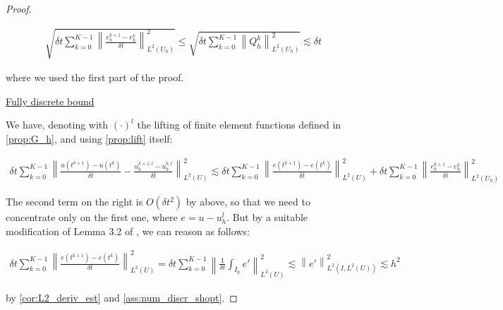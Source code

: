 \documentclass[english,a4paper,9pt,oneside]{scrbook}	%
\theoremstyle{break}
\newenvironment{mproof}[1][\proofname]{%
  \begin{proof}[#1]$ $\par\nobreak\ignorespaces
}{%
  \end{proof}
}
\renewcommand*{\proofname}{Proof}
\theoremstyle{remark}
\newcommand{\norm}[1]{\left\lVert#1\right\rVert}
\begin{document}
\begin{mproof}
%

\begin{align*}
\sqrt{\delta t \sum_{k=0}^{K-1} \norm{\frac{e_{h}^{k+1}-e_h^k}{\delta t}}_{L^2(U_h)}^2} \leq  \sqrt{\delta t \sum_{k=0}^{K-1}\norm{Q_h^k}_{L^2(U_h)}^2} \lesssim \delta t
\end{align*}

where we used the first part of the proof.

\underline{Fully discrete bound}

We have, denoting with $(\cdot)^l$ the lifting of finite element functions defined in \cref{prop:G_h}, and using \cref{prop:lift} itself:

\begin{align*}
	\delta t \sum_{k=0}^{K-1} \norm{\frac{u(t^{k+1})-u(t^k)}{\delta t} - \frac{u_h^{k+1,l}-u_h^{k, l}}{\delta t}}_{L^2(U)}^2\lesssim \delta t \sum_{k=0}^{K-1} \norm{\frac{e(t^{k+1})-e(t^k)}{\delta t}}_{L^2(U)}^2 +  \delta t \sum_{k=0}^{K-1} \norm{\frac{e_h^{k+1}-e_h^{k}}{\delta t}}_{L^2(U_h)}^2
\end{align*}

The second term on the right is $O(\delta t^2)$ by above, so that we need to concentrate only on the first one, where $e=u-u_h^l$. But by a suitable modification of Lemma 3.2 of \cite{lshou}, we can reason as follows:

\begin{align*}
\delta t \sum_{k=0}^{K-1} \norm{\frac{e(t^{k+1})-e(t^k)}{\delta t}}_{L^2(U)}^2 = \delta t \sum_{k=0}^{K-1} \norm{\frac{1}{\delta t}\int_{I_k}e'}_{L^2(U)}^2\lesssim \norm{e'}_{L^2(I,L^2(U))}^2\lesssim h^2
\end{align*}

by \cref{cor:L2_deriv_est} and \cref{ass:num_discr_shopt}.
\end{mproof}
\end{document}
